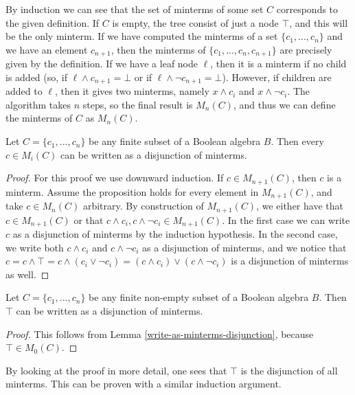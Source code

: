 By induction we can see that the set of minterms of some set $C$ corresponds to the given definition. If $C$ is empty, the tree consist of just a node ${\top}$, and this will be the only minterm. If we have computed the minterms of a set $\{c_1, ..., c_n\}$ and we have an element $c_{n+1}$, then the minterms of $\{c_1, ..., c_n, c_{n+1}\}$ are precisely given by the definition. If we have a leaf node $\ell$, then it is a minterm if no child is added (so, if $\ell \land c_{n+1} = \bot$ or if $\ell \land \neg c_{n+1} = \bot$). However, if children are added to $\ell$, then it gives two minterms, namely $x \land c_i$ and $x \land \neg c_i$. The algorithm takes $n$ steps, so the final result is $M_{n}(C)$, and thus we can define the minterms of $C$ as $M_{n}(C)$.

\begin{lem}
\label{write-as-minterms-disjunction}
Let $C = \{c_1, ..., c_n\}$ be any finite subset of a Boolean algebra $B$. Then every $c \in M_i(C)$ can be written as a disjunction of minterms.
\end{lem}

\begin{proof}
For this proof we use downward induction. If $c \in M_{n+1}(C)$, then $c$ is a minterm. Assume the proposition holds for every element in $M_{n+1}(C)$, and take $c \in M_{n}(C)$ arbitrary. By construction of $M_{n+1}(C)$, we either have that $c \in M_{n+1}(C)$ or that $c \land c_i, c \land \neg c_i \in M_{n+1}(C)$. In the first case we can write $c$ as a disjunction of minterms by the induction hypothesis. In the second case, we write both $c \land c_i$ and $c \land \neg c_i$ as a disjunction of minterms, and we notice that $c = c \land \top = c \land (c_i \lor \neg c_i) = (c \land c_i) \lor (c \land \neg c_i)$ is a disjunction of minterms as well. 
\end{proof}

\begin{lem}
Let $C = \{c_1, ..., c_n\}$ be any finite non-empty subset of a Boolean algebra $B$. Then $\top$ can be written as a disjunction of minterms.
\end{lem}

\begin{proof}
This follows from Lemma \ref{write-as-minterms-disjunction}, because $\top \in M_0(C)$.
\end{proof}

By looking at the proof in more detail, one sees that $\top$ is the disjunction of all minterms. This can be proven with a similar induction argument.

